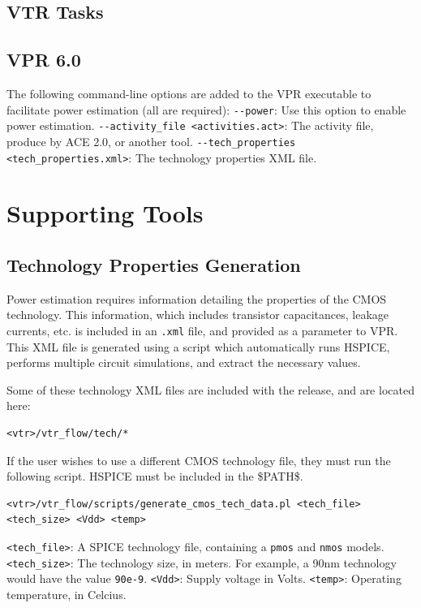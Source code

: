 \documentclass[letterpaper,twoside,10pt]{article}
\begin{document}
\subsection{VTR Tasks}
\subsection{VPR 6.0}
The following command-line options are added to the VPR executable to facilitate power estimation (all are required): \newline
\texttt{\--\--power}:  Use this option to enable power estimation. \newline
\texttt{\--\--activity\_file <activities.act>}: The activity file, produce by ACE 2.0, or another tool. \newline
\texttt{\--\--tech\_properties <tech\_properties.xml>}: The technology properties XML file.


\newpage
\section{Supporting Tools}
\subsection{Technology Properties Generation}
Power estimation requires information detailing the properties of the CMOS technology.  
This information, which includes transistor capacitances, leakage currents, etc. is included in an \texttt{.xml} file, and provided as a parameter to VPR.
This XML file is generated using a script which automatically runs HSPICE, performs multiple circuit simulations, and extract the necessary values.


Some of these technology XML files are included with the release, and are located here: 

\begin{BVerbatim}[bgcolor=LightGray, boxwidth=\textwidth]
<vtr>/vtr_flow/tech/*
\end{BVerbatim}
			
If the user wishes to use a different CMOS technology file, they must run the following script.  HSPICE must be included in the \$PATH\$.

\begin{BVerbatim}[bgcolor=LightGray, boxwidth=\textwidth] 
<vtr>/vtr_flow/scripts/generate_cmos_tech_data.pl <tech_file> <tech_size> <Vdd> <temp>
\end{BVerbatim}

\texttt{<tech\_file>}: A SPICE technology file, containing a \texttt{pmos} and \texttt{nmos} models. \newline
\texttt{<tech\_size>}: The technology size, in meters. For example, a 90nm technology would have the value \texttt{90e-9}. \newline
\texttt{<Vdd>}: Supply voltage in Volts. \newline
\texttt{<temp>}: Operating temperature, in Celcius. 
\end{document}
